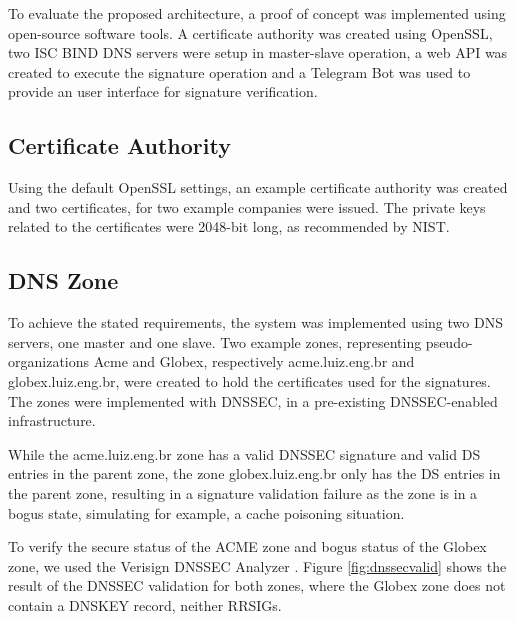 \documentclass[12pt]{article}
\begin{document}
To evaluate the proposed architecture, a proof of concept was implemented using open-source software tools. A certificate authority was created using OpenSSL, two ISC BIND DNS servers were setup in master-slave operation, a web API was created to execute the signature operation and a Telegram Bot was used to provide an user interface for signature verification. 

\subsection{Certificate Authority}

Using the default OpenSSL settings, an example certificate authority was created and two certificates, for two example companies were issued. The private keys related to the certificates were 2048-bit long, as recommended by NIST. 

\subsection{DNS Zone}

To achieve the stated requirements, the system was implemented using two DNS servers, one master and one slave. Two example zones, representing pseudo-organizations Acme and Globex, respectively acme.luiz.eng.br and globex.luiz.eng.br, were created to hold the certificates used for the signatures. The zones were implemented with DNSSEC, in a pre-existing DNSSEC-enabled infrastructure. 

While the acme.luiz.eng.br zone has a valid DNSSEC signature and valid DS entries in the parent zone, the zone globex.luiz.eng.br only has the DS entries in the parent zone, resulting in a signature validation failure as the zone is in a bogus state, simulating for example, a cache poisoning situation. 

To verify the secure status of the ACME zone and bogus status of the Globex zone, we used the Verisign DNSSEC Analyzer \cite{verisign_dnssec}. Figure \ref{fig:dnssecvalid} shows the result of the DNSSEC validation for both zones, where the Globex zone does not contain a DNSKEY record, neither RRSIGs.
\end{document}
